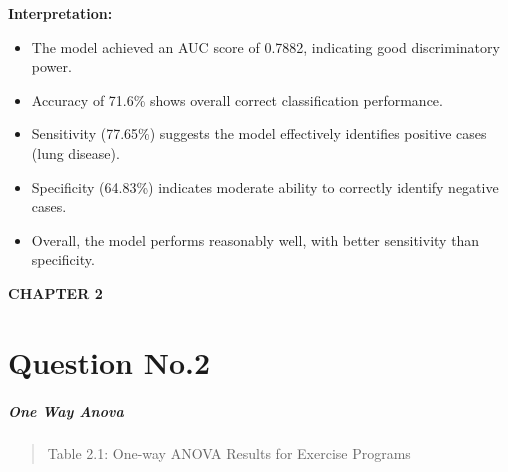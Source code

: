 \textbf{Interpretation:}

\begin{itemize}
\item
  The model achieved an AUC score of 0.7882, indicating good
  discriminatory power.
\item
  Accuracy of 71.6\% shows overall correct classification performance.
\item
  Sensitivity (77.65\%) suggests the model effectively identifies
  positive cases (lung disease).
\item
  Specificity (64.83\%) indicates moderate ability to correctly identify
  negative cases.
\item
  Overall, the model performs reasonably well, with better sensitivity
  than specificity.
\end{itemize}

\textbf{CHAPTER 2}

\section{Question No.2}\label{question-no.2}

\subparagraph{One Way Anova}\label{one-way-anova}

\begin{quote}
Table 2.1: One-way ANOVA Results for Exercise Programs
\end{quote}

